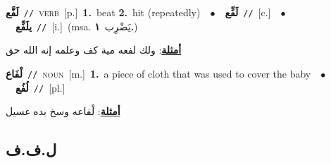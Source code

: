 \documentclass[10pt,a4paper,twoside]{article} %
\begin{document}
\begin{multicols}{2}
{\setlength\topsep{0pt}\textbf{\foreignlanguage{arabic}{لَفَّع}}\ {\color{gray}\texttt{//}\color{black}}\ \textsc{verb}\ [p.]\ \textbf{1.}~beat  \textbf{2.}~hit (repeatedly)\ \ $\bullet$\ \ \setlength\topsep{0pt}\textbf{\foreignlanguage{arabic}{لَفِّع}}\ {\color{gray}\texttt{//}\color{black}}\ [c.]\ \ $\bullet$\ \ \setlength\topsep{0pt}\textbf{\foreignlanguage{arabic}{يلَفِّع}}\ {\color{gray}\texttt{//}\color{black}}\ [i.]\ \color{gray}(msa. \foreignlanguage{arabic}{يَضْرِب}~\foreignlanguage{arabic}{\textbf{١.}})\color{black}\  \begin{flushright}\color{gray}\foreignlanguage{arabic}{\textbf{\underline{\foreignlanguage{arabic}{أمثلة}}}: ولك لفعه مية كف وعلمه إنه الله حق}\end{flushright}\color{black}} \vspace{2mm}

{\setlength\topsep{0pt}\textbf{\foreignlanguage{arabic}{لْفَاع}}\ {\color{gray}\texttt{//}\color{black}}\ \textsc{noun}\ [m.]\ \textbf{1.}~a piece of cloth that was used to cover the baby\ \ $\bullet$\ \ \setlength\topsep{0pt}\textbf{\foreignlanguage{arabic}{لُفُع}}\ {\color{gray}\texttt{//}\color{black}}\ [pl.]\  \begin{flushright}\color{gray}\foreignlanguage{arabic}{\textbf{\underline{\foreignlanguage{arabic}{أمثلة}}}: لْفاعه وسخ بده غسيل}\end{flushright}\color{black}} \vspace{2mm}

\vspace{-3mm}
\subsection*{\color{blue}\foreignlanguage{arabic}{ل.ف.ف}\color{blue}{}} 


\end{multicols}
\end{document}
